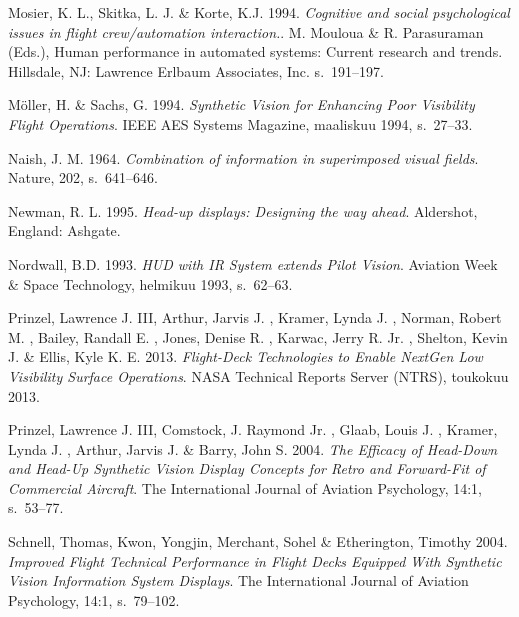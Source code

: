 \documentclass[utf8,bachelor,manualbib]{gradu3}
\begin{document}
\begin{thebibliography}{}
Mosier, K. L., Skitka, L. J. \& Korte, K.J. 1994.
\textit{Cognitive and social psychological issues in flight crew/automation interaction.}.
M. Mouloua \& R. Parasuraman (Eds.), Human performance in automated systems: Current research and trends. Hillsdale, NJ: Lawrence Erlbaum Associates, Inc. s.~191--197.

Möller, H. \& Sachs, G. 1994.
\textit{Synthetic Vision for Enhancing Poor Visibility Flight Operations}.
IEEE AES Systems Magazine, maaliskuu 1994, s.~27--33.

Naish, J. M. 1964.
\textit{Combination of information in superimposed visual fields}.
Nature, 202, s.~641--646.

Newman, R. L. 1995.
\textit{Head-up displays: Designing the way ahead}.
Aldershot, England: Ashgate.

Nordwall, B.D. 1993.
\textit{HUD with IR System extends Pilot Vision}.
Aviation Week \& Space Technology, helmikuu 1993, s.~62--63.

Prinzel, Lawrence J. III, Arthur, Jarvis J. , Kramer, Lynda J. ,  Norman, Robert M. , Bailey, Randall E. , Jones, Denise R. ,  Karwac, Jerry R. Jr. , Shelton, Kevin J. \& Ellis, Kyle K. E. 2013.
\textit{Flight-Deck Technologies to Enable NextGen Low Visibility Surface Operations}.
NASA Technical Reports Server (NTRS), toukokuu 2013.

Prinzel, Lawrence J. III, Comstock, J. Raymond Jr. , Glaab, Louis J. , Kramer, Lynda J. , Arthur, Jarvis J. \& Barry, John S. 2004.
\textit{The Efficacy of Head-Down and Head-Up Synthetic Vision Display Concepts for Retro and Forward-Fit of Commercial Aircraft}.
The International Journal of Aviation Psychology, 14:1, s.~53--77.

Schnell, Thomas,  Kwon, Yongjin, Merchant, Sohel \& Etherington, Timothy 2004.
\textit{Improved Flight Technical Performance in Flight Decks Equipped With Synthetic Vision Information System Displays}.
The International Journal of Aviation Psychology, 14:1, s.~79--102.


\end{thebibliography}
\end{document}
